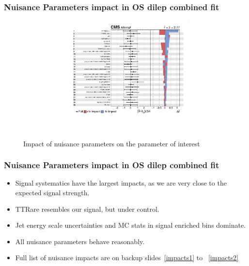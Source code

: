 \documentclass{beamer}
\begin{document}

\begin{frame}
\frametitle{Nuisance Parameters impact in OS dilep combined fit}
\vspace{-5pt}
\begin{figure}
	\includegraphics[width=0.8\textwidth]{impacts1.pdf}
	\vspace{-10pt} \caption{Impact of nuisance parameters on the parameter of interest}
\end{figure}
\end{frame}


\begin{frame}
\frametitle{Nuisance Parameters impact in OS dilep combined fit}

\begin{itemize}
	\item Signal systematics have the largest impacts, as we are very close to the expected signal strength.
	\vspace{5pt}
	\item TTRare resembles our signal, but under control.
	\vspace{5pt}
	\item Jet energy scale uncertainties and MC stats in signal enriched bins dominate.
	\vspace{5pt}
	\item All nuisance parameters behave reasonably.
	\vspace{5pt}
	\item Full list of nuisance impacts are on backup slides~\ref{impacts1} to ~\ref{impacts2}
\end{itemize}
\end{frame}
\end{document}
